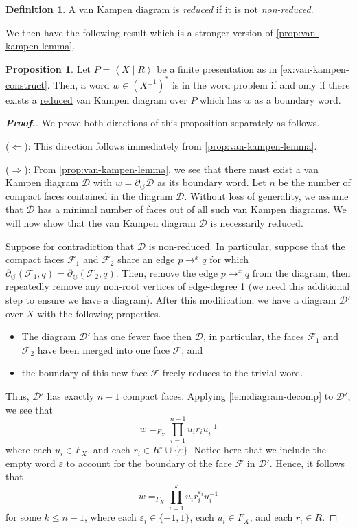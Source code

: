 \documentclass[11pt,a4paper,reqno]{amsart}
\theoremstyle{plain}
\theoremstyle{definition}
\newtheorem{proposition}[theorem]{Proposition}
\newtheorem{definition}[theorem]{Definition}
\theoremstyle{definition}
\renewcommand\leq\leqslant
\newenvironment{myproof}{\begin{proof}[\normalfont\bfseries Proof.]}{\end{proof}}
\begin{document}
\begin{definition}
	A van Kampen diagram is \emph{reduced} if it is not \emph{non-reduced}.
\end{definition}

We then have the following result which is a stronger version of \cref{prop:van-kampen-lemma}.

\begin{proposition}\label{prop:stong-van-kampen}
	Let $P = \left\langle X\mid R \right\rangle$ be a finite presentation as in \cref{ex:van-kampen-construct}.
	Then, a word $w\in (X^{\pm 1})^*$ is in the word problem if and only if there exists a \underline{reduced} van Kampen diagram over $P$ which has $w$ as a boundary word.
\end{proposition}

\begin{myproof}
	We prove both directions of this proposition separately as follows.

	\medskip
	\noindent
	($\Leftarrow$): This direction follows immediately from \cref{prop:van-kampen-lemma}.

	\medskip
	\noindent
	($\Rightarrow$):
	From \cref{prop:van-kampen-lemma}, we see that there must exist a van Kampen diagram $\mathcal D$ with $w = \partial_\circlearrowleft \mathcal D$ as its boundary word.
	Let $n$ be the number of compact faces contained in the diagram $\mathcal D$.
	Without loss of generality, we assume that $\mathcal D$ has a minimal number of faces out of all such van Kampen diagrams.
	We will now show that the van Kampen diagram $\mathcal D$ is necessarily reduced.

	Suppose for contradiction that $\mathcal D$ is non-reduced.
	In  particular, suppose that the compact faces $\mathcal F_1$ and $\mathcal F_2$ share an edge $p\to^x q$ for which $\partial_{\circlearrowleft} (\mathcal F_1,q) = \partial_\circlearrowright (\mathcal F_2,q)$.
	Then, remove the edge $p\to^x q$ from the diagram, then repeatedly remove any non-root vertices of edge-degree 1 (we need this additional step to ensure we have a diagram).
	After this modification, we have a diagram $\mathcal D'$ over $X$ with the following properties.
	\begin{itemize}
		\item The diagram $\mathcal D'$ has one fewer face then $\mathcal D$, in particular, the faces $\mathcal F_1$ and $\mathcal F_2$ have been merged into one face $\mathcal F$; and
		\item the boundary of this new face $\mathcal F$ freely reduces to the trivial word.
	\end{itemize}
	Thus, $\mathcal D'$ has exactly $n-1$ compact faces.
	Applying \cref{lem:diagram-decomp} to $\mathcal D'$, we see that
	\[
		w
		=_{F_X}
		\prod_{i=1}^{n-1}
		u_i r_i u_{i}^{-1}
	\]
	where each $u_i \in F_X$, and each $r_i \in R^\circ \cup \{ \varepsilon \}$.
	Notice here that we include the empty word $\varepsilon$ to account for the boundary of the face $\mathcal F$ in $\mathcal D'$.
	Hence, it follows that
	\[
		w
		=_{F_X}
		\prod_{i=1}^{k}
		u_i r_i^{\varepsilon_i} u_{i}^{-1}
	\]
	for some $k\leq n-1$, where each $\varepsilon_i \in \{-1,1\}$, each $u_i \in F_X$, and each $r_i \in R$.


\end{myproof}
\end{document}
